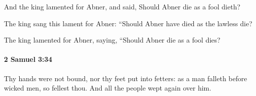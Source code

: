 			\begin{versebox}
					\item[BHS] 
					\item[ASV] And the king lamented for Abner, and said, Should Abner die as a fool dieth?
					\item[NIV] The king sang this lament for Abner: “Should Abner have died as the lawless die?
					\item[NRSV] The king lamented for Abner, saying, “Should Abner die as a fool dies?
			\end{versebox}

		\paragraph{2 Samuel 3:34} %
			\label{2SAMUEL-3-34}

			Thy hands were not bound, nor thy feet put into fetters: as a man falleth before wicked men, so fellest thou. And all the people wept again over him.

